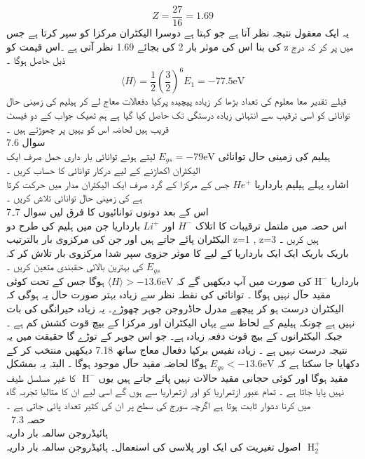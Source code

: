 \[Z=\frac{27}{16}=1.69\]
یہ ایک معقول نتیجہ نظر آتا ہے جو کہتا ہے دوسرا الیکٹران مرکزا کو سپر کرتا ہے جس کی بنا اس کی موثر بار 2 کی بجائے 1.69 نظر آتی ہے ۔اس قیمت کو z میں پر کر کہ درج ذیل حاصل ہوگا ۔\\
\[\langle H \rangle =\frac{1}{2}(\frac{3}{2})^{6}E_{1}=-77.5\text{eV}\]
قبلے تقدیر معا معلوم کی تعداد بڑھا کر زیادہ پیچیدہ پرکیا دفعالات معاج لے کر ہیلیم کی زمینی حال توانائی کو اسی ترقیب سے انتہائی زیادہ درستگی تک حاصل کیا گیا ہے ہم ٹھیک جواب کے دو فیسٹ قریب ہیں لحاضہ اس کو یہیں پر چھوڑتے ہیں ۔\\
سوال  
7.6\\
ہیلیم کی زمینی حال توانائی 
\(E_{gs}=-79\text{eV}\)
 لیتے ہوئے توانائی بار داری حمل صرف ایک الیکٹران اکھاڑنے کے لیے درکار توانائی کا حساب کریں ۔\\
اشارہ پہلے ہیلیم بارداریا
 \(He^{+}\)
 جس کے مرکزا کے گرد صرف ایک الیکٹران مدار میں حرکت کرتا ہے کی زمینی حال توانائی تلاش کریں ۔\\
اس کے بعد دونوں توانائیوں کا فرق لیں 
سوال 7۔7
\\
اس حصہ میں ملتمل ترقیبات کا اتلاک
 \(H^{-}\)
 اور
  \(Li^{+}\)
  بارداریا جن میں ہلیم کی طرح دو الیکٹران پائے جاتے ہیں اور جن کی مرکزوی بار بالترتیب z=1 , z=3 ہیں کریں ۔\\
باریک باریک ایک ایک بارداریا کے لیے کا موثر جزوی سپر شدا مرکزوی بار تلاش کر کہ 
\(E_{gs}\)
 کی بہترین بالائی حقبندی متعین کریں ۔\\
 بارداریا
 \(\text{H}^{-}\)
  کی صورت میں آپ دیکھیں گے کہ 
  \(\langle  H \rangle  > -13.6\text{eV}\) 
  ہوگا جس کے تحت کوئی مقید حآل نہیں ہوگا ۔
توانائی کی نقطہ نظر سے زیادہ بہتر صورت حال یہ ہوگی کہ الیکٹران درست ہو کر پیچھے مدرل حاڈروجن جوہر چھوڑے۔ یہ زیادہ حیرانگی کی بات نہیں ہے چونکہ ہیلیم کے لحاظ سے یہاں الیکٹران اور مرکزا کے بیچ قوت کشش کم ہے ۔ جبکہ الیکٹرانوں کے بیچ قوت دفعہ زیادہ ہے۔
جو اس جوہر کے توڑے گا حقیقت میں یہ نتیجہ درست نہیں ہے ۔ زیادہ نفیس برکیا دفعال معاج ساتھ 
7.18
دیکھیں 
منتخب کر کے دکھایا جا سکتا ہے کہ 
\(E_{gs}<-13.6\text{eV}\)
ہوگا لحاضہ مقید حآل موجود ہوگا ۔
البتہ یہ بمشکل مقید ہوگا اور کوئی حجانی مقید حالات نہیں پائے جاتے ہیں یوں
\(\text{ H}^{-}\)
 کا غیر مسلسل طیف نہیں پایا جاتا ہے ۔
تمام عبور ازتمراریا کو اور ازتمراریا سے ہوں گے اسی لیے ان کا متالیا تجربہ گاہ میں کرنا دشوار ثابت ہوتا ہے اگرچہ سورج کی سطح پر ان کی کثیر تعداد پائی جاتی ہے ۔\\
\
حصہ 
7.3\\
ہائیڈروجن سالمہ بار داریہ \\
اصول تغیریت کی ایک اور پلاسی کی استعمال۔ ہائیڈروجن سالمہ بار داریہ
\(\text{ H}_{2}^{+}\)
